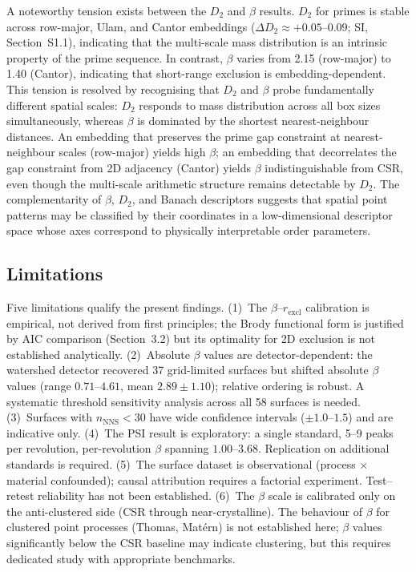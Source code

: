 \documentclass[final,1p,times]{elsarticle}
\theoremstyle{definition}
\begin{document}
A noteworthy tension exists between the $D_2$ and $\beta$ results.
$D_2$ for primes is stable across row-major, Ulam, and Cantor
embeddings ($\Delta D_2\approx+0.05$--$0.09$; SI, Section~S1.1),
indicating that the multi-scale mass distribution is an intrinsic
property of the prime sequence. In contrast, $\beta$ varies from
2.15 (row-major) to 1.40 (Cantor), indicating that short-range
exclusion is embedding-dependent. This tension is resolved by
recognising that $D_2$ and $\beta$ probe fundamentally different
spatial scales: $D_2$ responds to mass distribution across all box
sizes simultaneously, whereas $\beta$ is dominated by the shortest
nearest-neighbour distances. An embedding that preserves the prime
gap constraint at nearest-neighbour scales (row-major) yields high
$\beta$; an embedding that decorrelates the gap constraint from 2D
adjacency (Cantor) yields $\beta$ indistinguishable from CSR, even
though the multi-scale arithmetic structure remains detectable by
$D_2$. The complementarity of $\beta$, $D_2$, and Banach descriptors
suggests that spatial point patterns may be classified by their
coordinates in a low-dimensional descriptor space whose axes
correspond to physically interpretable order parameters.

\subsection{Limitations}

Five limitations qualify the present findings. (1)~The
$\beta$--$r_{\text{excl}}$ calibration is empirical, not derived from
first principles; the Brody functional form is justified by AIC
comparison (Section~3.2) but its optimality for 2D exclusion is not
established analytically. (2)~Absolute $\beta$ values are
detector-dependent: the watershed detector recovered 37 grid-limited
surfaces but shifted absolute $\beta$ values (range $0.71$--$4.61$,
mean $2.89\pm1.10$); relative ordering is robust. A systematic
threshold sensitivity analysis across all 58 surfaces is needed.
(3)~Surfaces with $n_{\text{NNS}}<30$ have wide confidence intervals
($\pm1.0$--$1.5$) and are indicative only.
(4)~The PSI result is exploratory: a single standard, 5--9 peaks per
revolution, per-revolution $\beta$ spanning $1.00$--$3.68$. Replication
on additional standards is required.
(5)~The surface dataset is observational (process $\times$ material
confounded); causal attribution requires a factorial experiment.
Test--retest reliability has not been established.
(6)~The $\beta$ scale is calibrated only on the anti-clustered side
(CSR through near-crystalline). The behaviour of $\beta$ for clustered
point processes (Thomas, Mat\'ern) is not established here; $\beta$
values significantly below the CSR baseline may indicate clustering,
but this requires dedicated study with appropriate benchmarks.
\end{document}

